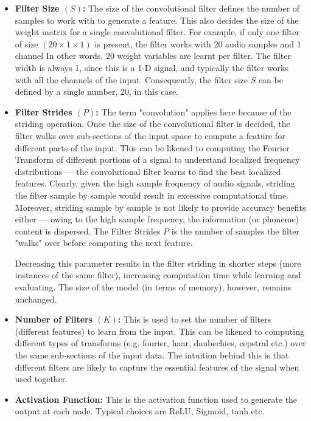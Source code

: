 \begin{itemize}
\item \textbf{Filter Size $(S)$:} The size of the convolutional filter defines the number of samples to work with to generate a feature.
 This also decides the size of the weight matrix for a single convolutional filter.
 For example, if only one filter of size $(20 \times 1 \times 1)$ is present, the filter works with 20 audio samples and 1 channel
 In other words, 20 weight variables are learnt per filter.
 The filter width is always 1, since this is a 1-D signal, and typically the filter works with all the channels of the input.
 Consequently, the filter size $S$ can be defined by a single number, 20, in this case.

\item \textbf{Filter Strides $(P)$:} The term "convolution" applies here because of the striding operation.
 Once the size of the convolutional filter is decided, the filter walks over sub-sections of the input space to compute a feature for different parts of the input.
 This can be likened to computing the Fourier Transform of different portions of a signal to understand localized frequency distributions --- the convolutional filter learns to find the best localized features.
 Clearly, given the high sample frequency of audio signals, striding the filter sample by sample would result in excessive computational time.
 Moreover, striding sample by sample is not likely to provide accuracy benefits either --- owing to the high sample frequency, the information (or phoneme) content is dispersed.
 The Filter Strides $P$ is the number of samples the filter "walks" over before computing the next feature.


Decreasing this parameter results in the filter striding in shorter steps (more instances of the same filter), increasing computation time while learning and evaluating.
 The size of the model (in terms of memory), however, remains unchanged.

\item \textbf{Number of Filters $(K)$:} This is used to set the number of filters (different features) to learn from the input.
 This can be likened to computing different types of transforms (e.g. fourier, haar, daubechies, cepstral etc.) over the same sub-sections of the input data.
 The intuition behind this is that different filters are likely to capture the essential features of the signal when used together.

\item \textbf{Activation Function:} This is the activation function used to generate the output at each node.
 Typical choices are ReLU, Sigmoid, tanh etc.

\end{itemize}

